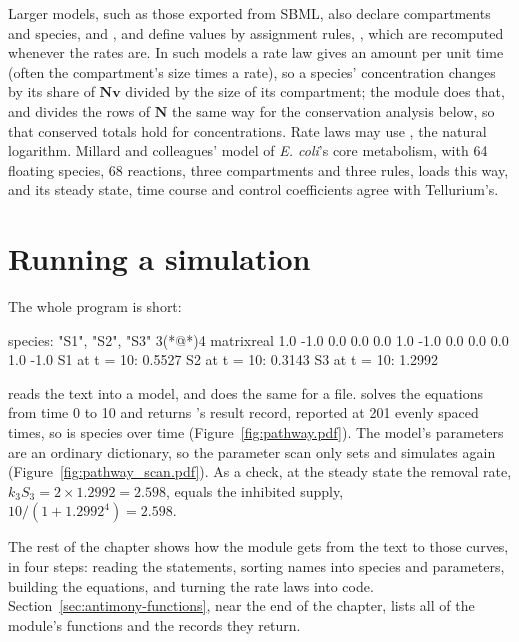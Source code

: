 \documentclass[11pt,a4paper,openany]{report}
\begin{document}
{{Larger models, such as those exported from SBML, also declare compartments
and species,  and
, and define values by assignment
rules, , which are recomputed whenever the
rates are. In such models a rate law gives an amount per unit time (often the
compartment's size times a rate), so a species' concentration changes by its
share of $\mathbf{N} \mathbf{v}$ divided by the size of its compartment; the module does that,
and divides the rows of $\mathbf{N}$ the same way for the conservation analysis below,
so that conserved totals hold for concentrations. Rate laws may use ,
the natural logarithm. Millard and colleagues' model of \emph{E. coli}'s core
metabolism, with 64 floating species, 68 reactions, three compartments and
three rules, loads this way, and its steady state, time course and control
coefficients agree with Tellurium's.

\section{Running a simulation}\label{sec:sim}

The whole program is short:

\begin{axonout}
species: {"S1", "S2", "S3"}
3(*@\texttimes@*)4 matrix{real}
  1.0  -1.0   0.0   0.0
  0.0   1.0  -1.0   0.0
  0.0   0.0   1.0  -1.0
S1 at t = 10: 0.5527
S2 at t = 10: 0.3143
S3 at t = 10: 1.2992
\end{axonout}

 reads the text into a model, and
 does the same for a file.  solves
the equations from time 0 to 10 and returns 's result record,
reported at 201 evenly spaced times, so  is species
 over time (Figure~\ref{fig:pathway.pdf}). The model's parameters are
an ordinary dictionary, so the parameter scan only sets
 and simulates again (Figure~\ref{fig:pathway_scan.pdf}).
As a check, at the steady state the removal rate,
$k_3 S_3 = 2 \times 1.2992 = 2.598$, equals the inhibited supply,
$10 / (1 + 1.2992^4) = 2.598$.


The rest of the chapter shows how the module gets from the text to those
curves, in four steps: reading the statements, sorting names into species
and parameters, building the equations, and turning the rate laws into code.
Section~\ref{sec:antimony-functions}, near the end of the chapter, lists all
of the module's functions and the records they return.

}}
\end{document}
